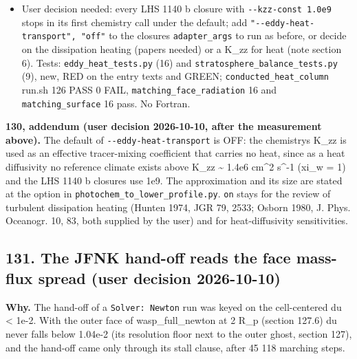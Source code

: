 \documentclass[english,a4paper]{my_memo}
\begin{document}
\begin{itemize}
  erg cm\^{}-2 s\^{}-1 above the tropopause (7.51e4 with the wind geometry), so it
  is not a steady state; the eddy-consistent reference exists only up to
  K\_zz = 1.78e5 (per\_model) and 1.42e6 (wind) cm\^{}2 s\^{}-1, where it reaches
  the 50 K end of the opacity tables; K\_zz = 1e9 is refused. With the
  K\_zz = 1e5 chemistry (composition held) T\_match goes from 408.87 K (off) to
  411.93 K (on): +7.18 K from the new T0, -4.13 K from the eddy conduction,
  0.10 K from the reference imbalance. Photochem\textquotesingle s equilibrium initializer
  fails below about 180-184 K, so the eddy-on adapter cannot run the
  chemistry on such references.
\item
  User decision needed: every LHS 1140 b closure with \texttt{-\/-kzz-const\ 1.0e9}
  stops in its first chemistry call under the default; add
  \texttt{"-\/-eddy-heat-transport",\ "off"} to the closure\textquotesingle s \texttt{adapter\_args} to run as
  before, or decide on the dissipation heating (papers needed) or a K\_zz for
  heat (note section 6).
  Tests: \texttt{eddy\_heat\_tests.py} (16) and \texttt{stratosphere\_balance\_tests.py} (9), new,
  RED on the entry texts and GREEN; \texttt{conducted\_heat\_column} run.sh 126 PASS 0
  FAIL, \texttt{matching\_face\_radiation} 16 and \texttt{matching\_surface} 16 pass. No Fortran.
\end{itemize}

\textbf{130, addendum (user decision 2026-10-10, after the measurement above).} The
default of \texttt{-\/-eddy-heat-transport} is OFF: the chemistry\textquotesingle s K\_zz is used as an
effective tracer-mixing coefficient that carries no heat, since as a heat
diffusivity no reference climate exists above K\_zz \textasciitilde{} 1.4e6 cm\^{}2 s\^{}-1
(xi\_w = 1) and the LHS 1140 b closures use 1e9. The approximation and its size
are stated at the option in \texttt{photochem\_to\_lower\_profile.py}. \texttt{on} stays for
the review of turbulent dissipation heating (Hunten 1974, JGR 79, 2533;
Osborn 1980, J. Phys. Oceanogr. 10, 83, both supplied by the user) and for
heat-diffusivity sensitivities.

\subsection{131. The JFNK hand-off reads the face mass-flux spread (user decision 2026-10-10)}\label{131-the-jfnk-hand-off-reads-the-face-mass-flux-spread-user-decision-2026-10-10}

\textbf{Why.} The hand-off of a \texttt{Solver:\ Newton} run was keyed on the cell-centered
du \textless{} 1e-2. With the outer face of wasp\_full\_newton at 2 R\_p (section 127.6) du
never falls below 1.04e-2 (its resolution floor next to the outer ghost,
section 127), and the hand-off came only through its stall clause, after
45 118 marching steps.
\end{document}
